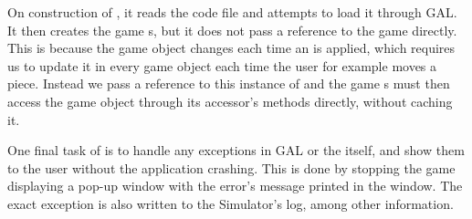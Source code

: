 On construction of , it reads the \productname{}
code file and attempts to load it through GAL. It then creates the
game s, but it does not pass a reference to the
game directly. This is because the game object changes each time an
 is applied, which requires us to update it in every
game object each time the user for example moves a piece. Instead we
pass a reference to this instance of  and the
game s must then access the game object through its
accessor's methods directly, without caching it.

One final task of  is to handle any exceptions
in GAL or the  itself, and show them to the user
without the application crashing. This is done by stopping the game
displaying a pop-up window with the error's message printed in the
window. The exact exception is also written to the Simulator's log,
among other information.
